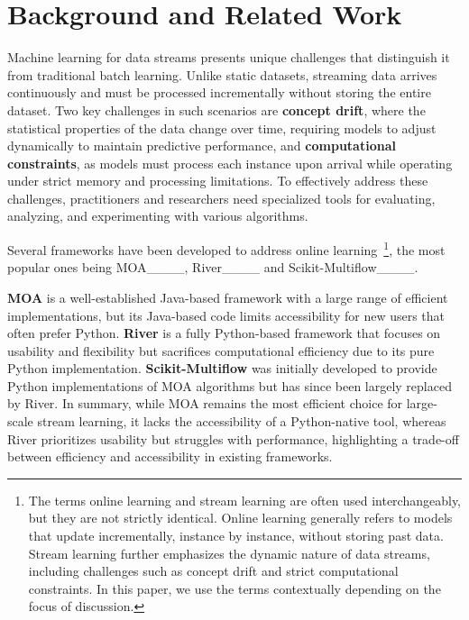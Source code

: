 \section{Background and Related Work}
Machine learning for data streams presents unique challenges that distinguish it from traditional batch learning. Unlike static datasets, streaming data arrives continuously and must be processed incrementally without storing the entire dataset. 
Two key challenges in such scenarios are \textbf{concept drift}, where the statistical properties of the data change over time, requiring models to adjust dynamically to maintain predictive performance, and \textbf{computational constraints}, as models must process each instance upon arrival while operating under strict memory and processing limitations. To effectively address these challenges, practitioners and researchers need specialized tools for evaluating, analyzing, and experimenting with various algorithms.

Several frameworks have been developed to address online learning~\footnote{The terms online learning and stream learning are often used interchangeably, but they are not strictly identical. Online learning generally refers to models that update incrementally, instance by instance, without storing past data. Stream learning further emphasizes the dynamic nature of data streams, including challenges such as concept drift and strict computational constraints. In this paper, we use the terms contextually depending on the focus of discussion.}, the most popular ones being MOA____, River____ and Scikit-Multiflow____. 

\textbf{MOA} is a well-established Java-based framework with a large range of efficient implementations, but its Java-based code limits accessibility for new users that often prefer Python. \textbf{River} is a fully Python-based framework that focuses on usability and flexibility but sacrifices computational efficiency due to its pure Python implementation. \textbf{Scikit-Multiflow} was initially developed to provide Python implementations of MOA algorithms but has since been largely replaced by River. In summary, while MOA remains the most efficient choice for large-scale stream learning, it lacks the accessibility of a Python-native tool, whereas River prioritizes usability but struggles with performance, highlighting a trade-off between efficiency and accessibility in existing frameworks. 

